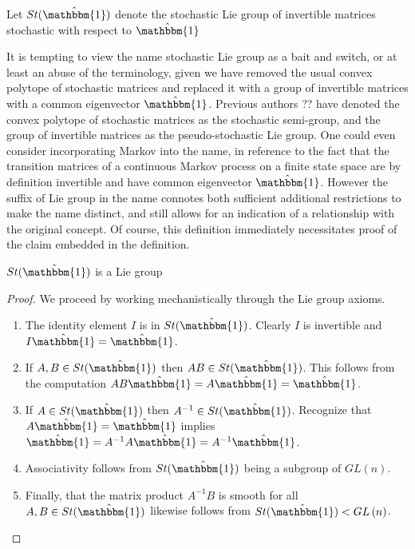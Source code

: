 \begin{definition}
	Let $St(\hat{\mathbbm{1}})$ denote the stochastic Lie group of invertible 
	matrices stochastic with respect to $\hat{\mathbbm{1}}$
\end{definition}

It is tempting to view the name stochastic Lie group as a bait and switch, or 
at least an abuse of the terminology, given we have removed the usual convex
polytope of stochastic matrices and replaced it with a group of invertible 
matrices with a common eigenvector $\hat{\mathbbm{1}}$. Previous authors ?? have 
denoted the convex polytope of stochastic matrices as the stochastic semi-group, 
and the group of invertible matrices as the pseudo-stochastic Lie group. One 
could even consider incorporating Markov into the name, in reference to the 
fact that the transition matrices of a continuous Markov process on a finite 
state space are by definition invertible and have common eigenvector $\hat{\mathbbm{1}}$. 
However the suffix of Lie group in the name connotes both sufficient additional 
restrictions to make the name distinct, and still allows for an indication of a 
relationship with the original concept. Of course, this definition immediately 
necessitates proof of the claim embedded in the definition.

\begin{lemma}
	$St(\hat{\mathbbm{1}})$ is a Lie group
\end{lemma}

\begin{proof}
	We proceed by working mechanistically through the Lie group axioms.
	\begin{enumerate}
		\item The identity element $I$ is in $St(\hat{\mathbbm{1}})$. Clearly $I$ is
		invertible and $I \hat{\mathbbm{1}} = \hat{\mathbbm{1}}$.
		\item If $A,B \in St(\hat{\mathbbm{1}})$ then $AB \in St(\hat{\mathbbm{1}})$. 
		This follows from the computation $AB \hat{\mathbbm{1}} = A \hat{\mathbbm{1}} = \hat{\mathbbm{1}}$.
		\item If $A \in St(\hat{\mathbbm{1}})$ then $A^{-1} \in St(\hat{\mathbbm{1}})$.
		Recognize that $A \hat{\mathbbm{1}} = \hat{\mathbbm{1}}$ implies $\hat{\mathbbm{1}} = A^{-1} A \hat{\mathbbm{1}} = A^{-1} \hat{\mathbbm{1}}$.
		\item Associativity follows from $St(\hat{\mathbbm{1}})$ being a subgroup of $GL\left(n\right)$.
		\item Finally, that the matrix product $A^{-1}B$ is smooth for all $A,B \in St(\hat{\mathbbm{1}})$
		likewise follows from $St(\hat{\mathbbm{1}}) < GL\left(n\right)$.
	\end{enumerate}
\end{proof}

